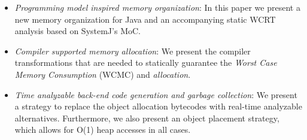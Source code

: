 \begin{itemize}
\item \textit{Programming model inspired memory organization}: In this
  paper we present a new memory organization for Java and an
  accompanying static WCRT analysis based on SystemJ's MoC.
\item \textit{Compiler supported memory allocation}: We present the
  compiler transformations that are needed to statically guarantee the
  \textit{Worst Case Memory Consumption} (WCMC) and \textit{allocation}.
\item \textit{Time analyzable back-end code generation and garbage
    collection}: We present a strategy to replace the object allocation
  bytecodes with real-time analyzable alternatives. Furthermore, we also
  present an object placement strategy, which allows for O(1) heap
  accesses in all cases.
\end{itemize}




